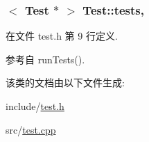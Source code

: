\subsubsection[{\texorpdfstring{tests}{tests}}]{$<$ {\bf Test} $\ast$ $>$ Test\+::tests\hspace{0.3cm}{\ttfamily [static]}, {\ttfamily [private]}}\hypertarget{classTest_ad03939a08980e2a62dd1d1cbcb13914c}{}\label{classTest_ad03939a08980e2a62dd1d1cbcb13914c}


在文件 test.\+h 第 9 行定义.



参考自 run\+Tests().



该类的文档由以下文件生成\+:\begin{DoxyCompactItemize}
\item 
include/\hyperlink{test_8h}{test.\+h}\item 
src/\hyperlink{test_8cpp}{test.\+cpp}\end{DoxyCompactItemize}
